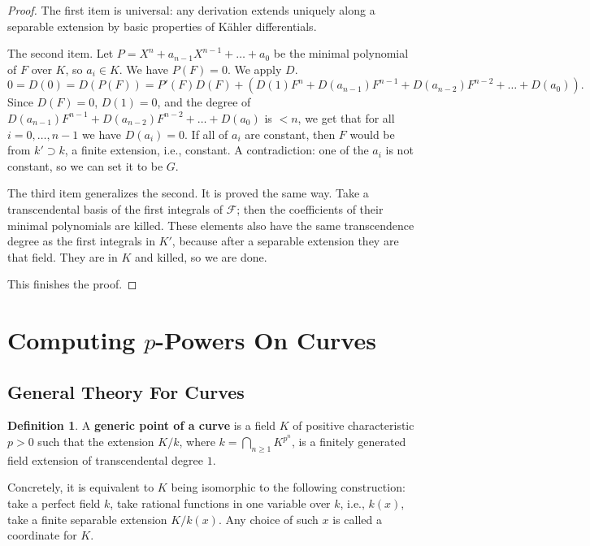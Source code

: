 \documentclass{amsart}
\newcommand{\F}{\mathcal{F}}
\theoremstyle{definition}
\newtheorem{defin}[thm]{Definition}
\begin{document}
\begin{proof}
    The first item is universal: any derivation extends uniquely along a separable extension by basic properties of K{\"a}hler differentials.

    The second item. Let $P=X^n+a_{n-1}X^{n-1}+\ldots +a_0$ be the minimal polynomial of $F$ over $K$, so $a_i\in K$. We have $P(F)=0$. We apply $D$.
    \[
    0=D(0)=D(P(F))=P'(F)D(F)+(D(1)F^n+D(a_{n-1})F^{n-1}+D(a_{n-2})F^{n-2}+\ldots+D(a_0)).
    \]
    Since $D(F)=0$, $D(1)=0$, and the degree of $D(a_{n-1})F^{n-1}+D(a_{n-2})F^{n-2}+\ldots+D(a_0)$ is $<n$, we get that
    for all $i=0,\ldots,n-1$ we have $D(a_i)=0$.
    If all of $a_i$ are constant, then $F$ would be from $k'\supset k$, a finite extension, i.e., constant. A contradiction: one of the $a_i$ is not constant, so we can set it to be $G$. 

    The third item generalizes the second. It is proved the same way. Take a transcendental basis of the first integrals of $\F$; then the coefficients of their minimal polynomials are killed. These elements also have the same transcendence degree as the first integrals in $K'$, because after a separable extension they are that field. They are in $K$ and killed, so we are done.

    This finishes the proof.
\end{proof}





\section{Computing \texorpdfstring{$p$}{p}-Powers On Curves}

\subsection{General Theory For Curves}

\begin{defin}
    A \textbf{generic point of a curve} is a field $K$ of positive characteristic $p>0$ such that the extension $K/k$, where $k=\bigcap_{n\ge 1} K^{p^n}$, is a finitely generated field extension of transcendental degree $1$.
    
    Concretely, it is equivalent to $K$ being isomorphic to the following construction: take a perfect field $k$, take rational functions in one variable over $k$, i.e., $k(x)$, take a finite separable extension $K/k(x)$. Any choice of such $x$ is called a coordinate for $K$.
\end{defin}
\end{document}
